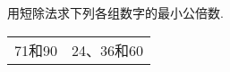 
用短除法求下列各组数字的最小公倍数. \\
\begin{tabular}{cc}
71和90\hspace{16em} & 24、36和60\hspace{16em} \\[12em]

\end{tabular}
